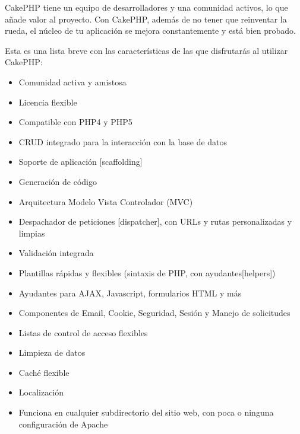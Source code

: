 CakePHP tiene un equipo de desarrolladores y una comunidad activos, lo que añade valor al proyecto. Con CakePHP, además de no tener que reinventar la rueda, el núcleo de tu aplicación se mejora constantemente y está bien probado.

Esta es una lista breve con las características de las que disfrutarás al utilizar CakePHP:
\begin{itemize}

	\item Comunidad activa y amistosa

    \item Licencia flexible
    
    \item Compatible con PHP4 y PHP5
    
    \item CRUD integrado para la interacción con la base de datos
    
    \item Soporte de aplicación [scaffolding]
    
    \item Generación de código
    
    \item Arquitectura Modelo Vista Controlador (MVC)
    
    \item Despachador de peticiones [dispatcher], con URLs y rutas personalizadas y limpias
    
    \item Validación integrada
    
    \item Plantillas rápidas y flexibles (sintaxis de PHP, con ayudantes[helpers])
    
    \item Ayudantes para AJAX, Javascript, formularios HTML y más
    
    \item Componentes de Email, Cookie, Seguridad, Sesión y Manejo de solicitudes
    
    \item Listas de control de acceso flexibles
    
    \item Limpieza de datos
    
    \item Caché flexible
    
    \item Localización
    
    \item Funciona en cualquier subdirectorio del sitio web, con poca o ninguna configuración de Apache

	
	
\end{itemize}

